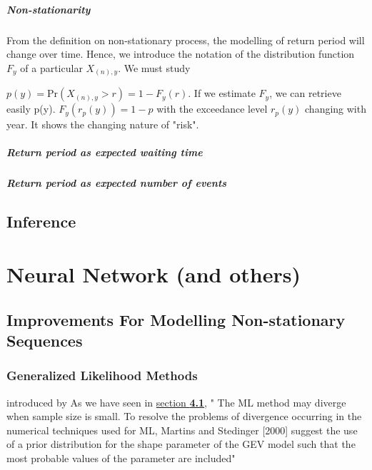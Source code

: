 \documentclass[11pt,a4paper,openany ]{book}
\begin{document}
\paragraph*{Non-stationarity}

From the definition on non-stationary process, the modelling of return period will change over time.
Hence, we introduce the notation of the distribution function $F_y$ of a particular $X_{(n),y}$. We must study 

$p(y)=\text{Pr}(X_{(n),y}>r)=1-F_y(r)$. If we estimate $F_y$, we can retrieve easily p(y).
$F_y(r_p(y))=1-p$ with the exceedance level $r_p(y)$ changing with year. It shows the changing nature of "risk".

\paragraph*{Return period as expected waiting time}

\paragraph*{Return period as expected number of events}

\section{Inference}


\chapter{Neural Network (and others) }
\vspace{-1cm}
\minitoc\thispagestyle{empty}
\section{Improvements For Modelling Non-stationary Sequences}\label{improvinf}
\subsection{Generalized Likelihood Methods}
introduced by \citet{martin_generalized_2000}
As we have seen in \hyperref[likintro]{section \textbf{4.1}}, 
" The ML method may diverge
when sample size is small. To resolve the problems of
divergence occurring in the numerical techniques used for
ML, Martins and Stedinger [2000] suggest the use of a prior
distribution for the shape parameter of the GEV model such
that the most probable values of the parameter are included"
\end{document}
